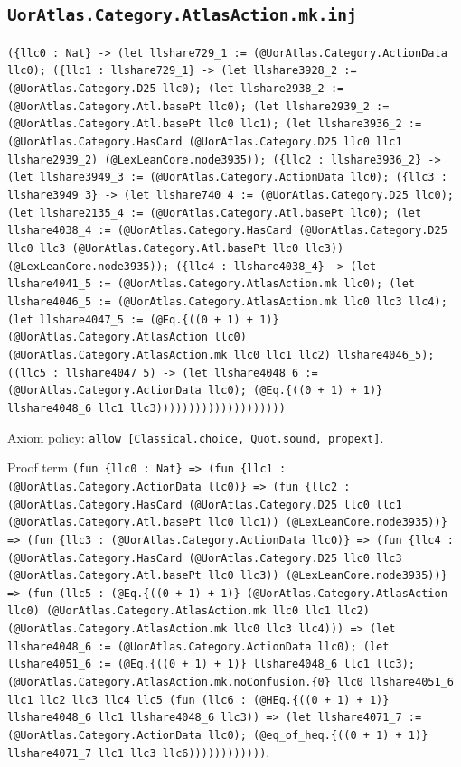 \documentclass[11pt]{article}
\begin{document}
\subsection*{\texttt{UorAtlas.Category.AtlasAction.mk.inj}}
\noindent\texttt{(\{llc0 : Nat\} -> (let llshare729\_1 := (@UorAtlas.Category.ActionData llc0); (\{llc1 : llshare729\_1\} -> (let llshare3928\_2 := (@UorAtlas.Category.D25 llc0); (let llshare2938\_2 := (@UorAtlas.Category.Atl.basePt llc0); (let llshare2939\_2 := (@UorAtlas.Category.Atl.basePt llc0 llc1); (let llshare3936\_2 := (@UorAtlas.Category.HasCard (@UorAtlas.Category.D25 llc0 llc1 llshare2939\_2) (@LexLeanCore.node3935)); (\{llc2 : llshare3936\_2\} -> (let llshare3949\_3 := (@UorAtlas.Category.ActionData llc0); (\{llc3 : llshare3949\_3\} -> (let llshare740\_4 := (@UorAtlas.Category.D25 llc0); (let llshare2135\_4 := (@UorAtlas.Category.Atl.basePt llc0); (let llshare4038\_4 := (@UorAtlas.Category.HasCard (@UorAtlas.Category.D25 llc0 llc3 (@UorAtlas.Category.Atl.basePt llc0 llc3)) (@LexLeanCore.node3935)); (\{llc4 : llshare4038\_4\} -> (let llshare4041\_5 := (@UorAtlas.Category.AtlasAction.mk llc0); (let llshare4046\_5 := (@UorAtlas.Category.AtlasAction.mk llc0 llc3 llc4); (let llshare4047\_5 := (@Eq.\{((0 + 1) + 1)\} (@UorAtlas.Category.AtlasAction llc0) (@UorAtlas.Category.AtlasAction.mk llc0 llc1 llc2) llshare4046\_5); ((llc5 : llshare4047\_5) -> (let llshare4048\_6 := (@UorAtlas.Category.ActionData llc0); (@Eq.\{((0 + 1) + 1)\} llshare4048\_6 llc1 llc3))))))))))))))))))))}\par
\noindent Axiom policy: \texttt{allow [Classical.choice, Quot.sound, propext]}.\par
\noindent Proof term \texttt{(fun \{llc0 : Nat\} => (fun \{llc1 : (@UorAtlas.Category.ActionData llc0)\} => (fun \{llc2 : (@UorAtlas.Category.HasCard (@UorAtlas.Category.D25 llc0 llc1 (@UorAtlas.Category.Atl.basePt llc0 llc1)) (@LexLeanCore.node3935))\} => (fun \{llc3 : (@UorAtlas.Category.ActionData llc0)\} => (fun \{llc4 : (@UorAtlas.Category.HasCard (@UorAtlas.Category.D25 llc0 llc3 (@UorAtlas.Category.Atl.basePt llc0 llc3)) (@LexLeanCore.node3935))\} => (fun (llc5 : (@Eq.\{((0 + 1) + 1)\} (@UorAtlas.Category.AtlasAction llc0) (@UorAtlas.Category.AtlasAction.mk llc0 llc1 llc2) (@UorAtlas.Category.AtlasAction.mk llc0 llc3 llc4))) => (let llshare4048\_6 := (@UorAtlas.Category.ActionData llc0); (let llshare4051\_6 := (@Eq.\{((0 + 1) + 1)\} llshare4048\_6 llc1 llc3); (@UorAtlas.Category.AtlasAction.mk.noConfusion.\{0\} llc0 llshare4051\_6 llc1 llc2 llc3 llc4 llc5 (fun (llc6 : (@HEq.\{((0 + 1) + 1)\} llshare4048\_6 llc1 llshare4048\_6 llc3)) => (let llshare4071\_7 := (@UorAtlas.Category.ActionData llc0); (@eq\_of\_heq.\{((0 + 1) + 1)\} llshare4071\_7 llc1 llc3 llc6))))))))))))}.\par
\end{document}
